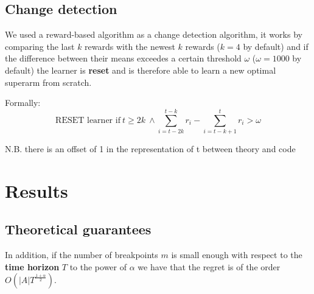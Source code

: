 \subsection{Change detection}

We used a reward-based algorithm as a change detection algorithm, it works by comparing the last $k$ rewards with the newest $k$ rewards ($k=4$ by default) and if the difference between their means exceedes a certain threshold $\omega$ ($\omega=1000$ by default) the learner is \textbf{reset} and is therefore able to learn a new optimal superarm from scratch.

Formally:
\begin{displaymath}
    \text{RESET learner if} ~ t \geq 2k ~ \land \sum_{i=t-2k}^{t-k} r_i -\sum_{i=t-k+1}^t r_i > \omega
\end{displaymath}

{\scriptsize N.B. there is an offset of 1 in the representation of t between theory and code}

\section{Results}
\label{sec:ns_demand_res}


\subsection{Theoretical guarantees}

In addition, if the number of breakpoints $m$ is small enough with respect to the \textbf{time horizon} $T$ to the power of $\alpha$ we have that the regret is of the order $O\left( \vert A \vert T^{\frac{1+\alpha}{2}} \right)$.
